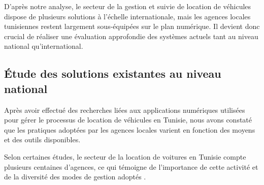 \medskip

D'après notre analyse, le secteur de la gestion et suivie de location de véhicules dispose de plusieurs solutions à l'échelle internationale, mais les agences locales tunisiennes restent largement sous-équipées sur le plan numérique. Il devient donc crucial de réaliser une évaluation approfondie des systèmes actuels tant au niveau national qu'international.

\subsection{Étude des solutions existantes au niveau national}
Après avoir effectué des recherches liées aux applications numériques utilisées pour gérer le processus de location de véhicules en Tunisie, nous avons constaté que les pratiques adoptées par les agences locales varient en fonction des moyens et des outils disponibles.

Selon certaines études, le secteur de la location de voitures en Tunisie compte plusieurs centaines d’agences, ce qui témoigne de l’importance de cette activité et de la diversité des modes de gestion adoptés \cite{letemps_news}.

